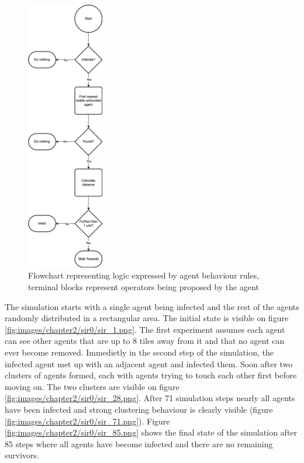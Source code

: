 \begin{figure}[H]
    \centering
    \includegraphics[width=0.3\textwidth]{images/chapter2/sir_logic.drawio.png}
    \caption{Flowchart representing logic expressed by agent behaviour rules, terminal blocks represent operators being proposed by the agent}\label{fig:sir_logic.drawio.png}
\end{figure}

The simulation starts with a single agent being infected and the rest of the agents randomly distributed in a rectangular area.
The initial state is visible on figure \ref{fig:images/chapter2/sir0/sir_1.png}.
The first experiment assumes each agent can see other agents that are up to 8 tiles away from it and that no agent can ever become removed.
Immedietly in the second step of the simulation, the infected agent met up with an adjacent agent and infected them.
Soon after two clusters of agents formed, each with agents trying to touch each other first before moving on.
The two clusters are visible on figure \ref{fig:images/chapter2/sir0/sir_28.png}.
After 71 simulation steps nearly all agents have been infected and strong clustering behaviour is clearly visible (figure \ref{fig:images/chapter2/sir0/sir_71.png}).
Figure \ref{fig:images/chapter2/sir0/sir_85.png} shows the final state of the simulation after 85 steps where all agents have become infected and there are no remaining survivors.

